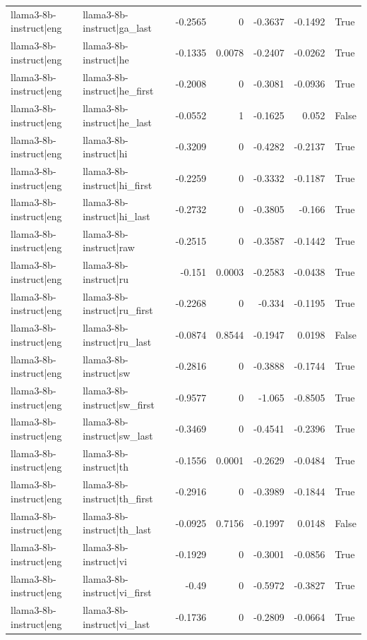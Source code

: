 \begin{table}
\begin{tabular}{l l r r r r l}
llama3-8b-instruct|eng & llama3-8b-instruct|ga_last & -0.2565 & 0 & -0.3637 & -0.1492 & True \\
llama3-8b-instruct|eng & llama3-8b-instruct|he & -0.1335 & 0.0078 & -0.2407 & -0.0262 & True \\
llama3-8b-instruct|eng & llama3-8b-instruct|he_first & -0.2008 & 0 & -0.3081 & -0.0936 & True \\
llama3-8b-instruct|eng & llama3-8b-instruct|he_last & -0.0552 & 1 & -0.1625 & 0.052 & False \\
llama3-8b-instruct|eng & llama3-8b-instruct|hi & -0.3209 & 0 & -0.4282 & -0.2137 & True \\
llama3-8b-instruct|eng & llama3-8b-instruct|hi_first & -0.2259 & 0 & -0.3332 & -0.1187 & True \\
llama3-8b-instruct|eng & llama3-8b-instruct|hi_last & -0.2732 & 0 & -0.3805 & -0.166 & True \\
llama3-8b-instruct|eng & llama3-8b-instruct|raw & -0.2515 & 0 & -0.3587 & -0.1442 & True \\
llama3-8b-instruct|eng & llama3-8b-instruct|ru & -0.151 & 0.0003 & -0.2583 & -0.0438 & True \\
llama3-8b-instruct|eng & llama3-8b-instruct|ru_first & -0.2268 & 0 & -0.334 & -0.1195 & True \\
llama3-8b-instruct|eng & llama3-8b-instruct|ru_last & -0.0874 & 0.8544 & -0.1947 & 0.0198 & False \\
llama3-8b-instruct|eng & llama3-8b-instruct|sw & -0.2816 & 0 & -0.3888 & -0.1744 & True \\
llama3-8b-instruct|eng & llama3-8b-instruct|sw_first & -0.9577 & 0 & -1.065 & -0.8505 & True \\
llama3-8b-instruct|eng & llama3-8b-instruct|sw_last & -0.3469 & 0 & -0.4541 & -0.2396 & True \\
llama3-8b-instruct|eng & llama3-8b-instruct|th & -0.1556 & 0.0001 & -0.2629 & -0.0484 & True \\
llama3-8b-instruct|eng & llama3-8b-instruct|th_first & -0.2916 & 0 & -0.3989 & -0.1844 & True \\
llama3-8b-instruct|eng & llama3-8b-instruct|th_last & -0.0925 & 0.7156 & -0.1997 & 0.0148 & False \\
llama3-8b-instruct|eng & llama3-8b-instruct|vi & -0.1929 & 0 & -0.3001 & -0.0856 & True \\
llama3-8b-instruct|eng & llama3-8b-instruct|vi_first & -0.49 & 0 & -0.5972 & -0.3827 & True \\
llama3-8b-instruct|eng & llama3-8b-instruct|vi_last & -0.1736 & 0 & -0.2809 & -0.0664 & True \\

\end{tabular}
\end{table}
